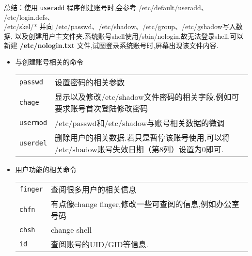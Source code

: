 总结：使用 \texttt{useradd} 程序创建账号时,会参考 /etc/default/useradd、%
/etc/login.defs、\\
/etc/skel/* 并向 /etc/passwd、/etc/shadow、/etc/group、/etc/gshadow写入数据,%
以及创建用户主文件夹.系统账号shell使用/sbin/nologin,故无法登录shell,可以新建%
\textbf{/etc/nologin.txt} 文件,试图登录系统账号时,屏幕出现该文件内容.

\begin{itemize}
\renewcommand{\arraystretch}{1.1}
\item 与创建账号相关的命令
\begin{longtable}{l@{: }p{}}\hline\hline
     \texttt{passwd} & 设置密码的相关参数\\

     \texttt{chage} & 显示以及修改/etc/shadow文件密码的相关字段,例如可要求账号首次登陆修改密码\\

     \texttt{usermod} &  /etc/passwd和/etc/shadow与账号相关数据的微调\\

     \texttt{userdel} & 删除用户的相关数据.若只是暂停该账号使用,可以将%
    /etc/shadow账号失效日期（第8列）设置为0即可.\\\hline
\end{longtable}

\item 用户功能的相关命令
\begin{longtable}{l@{: }p{}}\hline\hline
     \texttt{finger} & 查阅很多用户的相关信息\\

     \texttt{chfn} & 有点像change finger,修改一些可查阅的信息,例如办公室号码\\

     \texttt{chsh} &  change shell\\

     \texttt{id} & 查阅账号的UID/GID等信息.\\\hline
\end{longtable}


\end{itemize}

